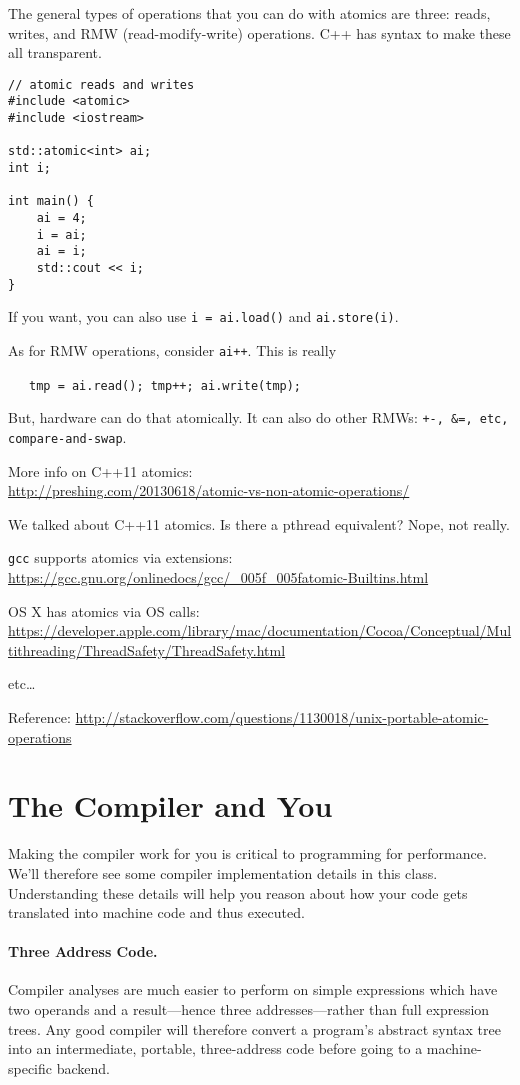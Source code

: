 The general types of operations that you can do with atomics are three: reads, writes, and
RMW (read-modify-write) operations. C++ has syntax to make these all transparent.

\begin{verbatim}
// atomic reads and writes
#include <atomic>
#include <iostream>

std::atomic<int> ai;
int i;

int main() {
    ai = 4;
    i = ai;
    ai = i;
    std::cout << i;
}
\end{verbatim}
If you want, you can also use {\tt i = ai.load()} and {\tt ai.store(i)}.

As for RMW operations, consider {\tt ai++}. This is really

~~~{\tt tmp = ai.read(); tmp++; ai.write(tmp); }

But, hardware can do that atomically. It can also do other RMWs: {\tt +-, \&=, etc, compare-and-swap}.

More info on C++11 atomics:\\
\url{http://preshing.com/20130618/atomic-vs-non-atomic-operations/}

We talked about C++11 atomics. Is there a pthread equivalent? Nope, not really.

{\tt gcc} supports atomics via extensions: \\
\url{https://gcc.gnu.org/onlinedocs/gcc/_005f_005fatomic-Builtins.html}

OS X has atomics via OS calls: \\
\url{https://developer.apple.com/library/mac/documentation/Cocoa/Conceptual/Multithreading/ThreadSafety/ThreadSafety.html}

etc\ldots

Reference:
\url{http://stackoverflow.com/questions/1130018/unix-portable-atomic-operations}


\section*{The Compiler and You}
Making the compiler work for you is critical to programming for
performance. We'll therefore see some compiler implementation details
in this class. Understanding these details will help you reason about
how your code gets translated into machine code and thus executed.

\paragraph{Three Address Code.} Compiler analyses are much easier to
perform on simple expressions which have two operands and a
result---hence three addresses---rather than full expression trees.
Any good compiler will therefore convert a program's abstract syntax
tree into an intermediate, portable, three-address code before going
to a machine-specific backend.

